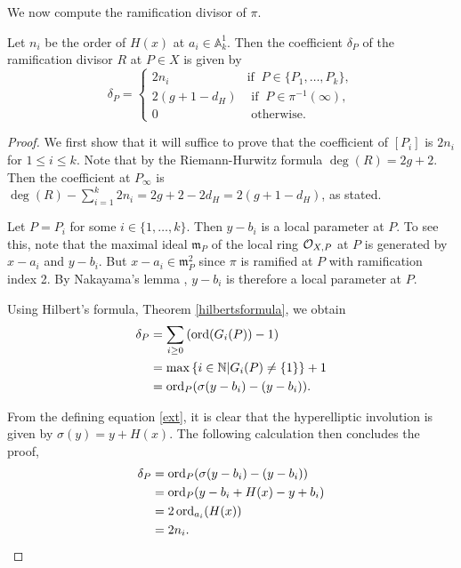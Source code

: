 We now compute the ramification divisor of $\pi$.


    \begin{lem}\label{char2ramification}
    Let $n_i$ be the order of $H(x)$ at $a_i\in \mathbb A_k^1$.
    Then the coefficient $\delta_P$ of the ramification divisor $R$ at $P\in X$ is given by
        \[
        \delta_P = \left\{
            \begin{array}{ll}
            2n_i & \text{if }\ P\in \{P_1,\ldots ,P_k\}, \\
            2(g+1-d_H) & \text{ if }\  P \in \pi^{-1}(\infty), \\
            0 & \text{ otherwise.} 
            \end{array}
        \right.
        \]
    \end{lem}
    \begin{proof}
    We first show that it will suffice to prove that the coefficient of $[P_i]$ is $2n_i$ for $1\leq i \leq k$.
    Note that by the Riemann-Hurwitz formula $\deg(R) = 2g+2$.
    Then the coefficient at $P_\infty$ is $\deg(R) - \sum_{i=1}^k2n_i = 2g+2-2d_H = 2(g+1-d_H)$, as stated.
    
    Let $P=P_i$ for some $i\in \{1,\ldots , k\}$.
    Then $y-b_i$ is a local parameter at $P$.
    To see this, note that the maximal ideal $\mathfrak m_{P}$ of the local ring ${\cal O}_{X,P}$ at $P$ is generated by $x-a_i$ and $y-b_i$.
    But $x-a_i\in \mathfrak m_{P}^2$ since $\pi$ is ramified at $P$ with ramification index 2.
    By Nakayama's lemma \cite[Prop. 2.6]{atiyahmacdonald}, $y-b_i$ is therefore a local parameter at $P$.
    
    Using Hilbert's formula, Theorem \ref{hilbertsformula}, we obtain
        \begin{align*}
        \delta_P & =  \sum_{i\geq 0} \left(\operatorname{ord}(G_i(P))-1\right) \\
        & =  \max\left\{ i\in {\mathbb N} | G_i(P)\neq \{1\}\right\} + 1 \\
        & =  \operatorname{ord}_{P}(\sigma(y-b_i) - (y-b_i)).
        \end{align*}
    
    From the defining equation \eqref{ext}, it is clear that the hyperelliptic involution is given by $\sigma(y)=y+H(x)$.
    The following calculation then concludes the proof,
        \begin{align*}
        \delta_P & =  \operatorname{ord}_{P}(\sigma(y-b_i) - (y-b_i)) \\
        & =  \operatorname{ord}_{P}(y-b_i+H(x) - y + b_i) \\
        & =  2\operatorname{ord}_{a_i}(H(x)) \\
        & =  2n_i.
        \end{align*}
    \end{proof}


